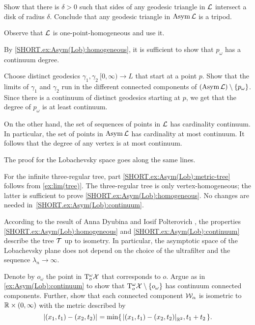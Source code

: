 Show that there is $\delta>0$ such that sides of any geodesic triangle in $\mathcal{L}$ intersect a disk of radius $\delta$.
Conclude that any geodesic triangle in $\mathop{\rm Asym}\nolimits\mathcal{L}$ is a tripod.

 Observe that $\mathcal{L}$ is one-point-homogeneous and use it.

By \ref{SHORT.ex:Asym(Lob):homogeneous}, it is sufficient to show that $p_\omega$ has a continuum degree.

Choose distinct geodesics $\gamma_1,\gamma_2\:[0,\infty)\to L$ that start at a point $p$.
Show that the limits of $\gamma_1$ and $\gamma_2$ run in the different connected components of $(\mathop{\rm Asym}\nolimits\mathcal{L})\setminus \{p_\omega\}$.
Since there is a continuum of distinct geodesics starting at $p$,
we get that the degree of $p_\omega$ is at least continuum.

On the other hand, the set of sequences of points in $\mathcal{L}$  has cardinality continuum.
In particular, the set of points in $\mathop{\rm Asym}\nolimits\mathcal{L}$ has cardinality at most continuum.
It follows that the degree of any vertex is at most continuum.

The proof for the Lobachevsky space goes along the same lines.

For the infinite three-regular tree, part \ref{SHORT.ex:Asym(Lob):metric-tree} follows from \ref{ex:lim(tree)}.
The three-regular tree is only vertex-homogeneous; the latter is sufficient to prove \ref{SHORT.ex:Asym(Lob):homogeneous}.
No changes are needed in~\ref{SHORT.ex:Asym(Lob):continuum}.

According to the result of Anna Dyubina and Iosif Polterovich \cite{dyubina-polterovich}, the properties \ref{SHORT.ex:Asym(Lob):homogeneous} and \ref{SHORT.ex:Asym(Lob):continuum} describe the tree $\mathcal{T}$ up to isometry.
In particular, the asymptotic space of the Lobachevsky plane does not depend on the choice of the ultrafilter and the sequence $\lambda_n\to \infty$.


Denote by $o_\omega$ the point in $\mathrm{T}^\omega_o\mathcal{X}$ that corresponds to $o$.
Argue as in \ref{ex:Asym(Lob):continuum} to show that $\mathrm{T}^\omega_o\mathcal{X}\setminus \{o_\omega\}$ has continuum connected components.
Further, show that each connected component $\mathcal{W}_\alpha$ is isometric to $\mathbb{R}\times (0,\infty)$ with the metric described by
\[\dist{(x_1,t_1)}{(x_2,t_2)}{}=\min\{\,\dist{(x_1,t_1)}{(x_2,t_2)}{\RR^2},t_1+t_2\,\}.\]

